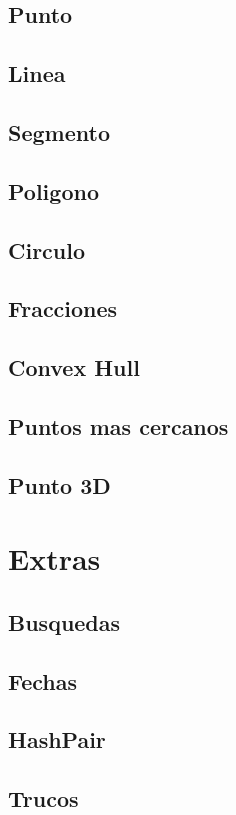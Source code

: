\subsection{Punto}
\raggedbottom
\hrulefill
\subsection{Linea}
\raggedbottom
\hrulefill
\subsection{Segmento}
\raggedbottom
\hrulefill
\subsection{Poligono}
\raggedbottom
\hrulefill
\subsection{Circulo}
\raggedbottom
\hrulefill
\subsection{Fracciones}
\raggedbottom
\hrulefill
\subsection{Convex Hull}
\raggedbottom
\hrulefill
\subsection{Puntos mas cercanos}
\raggedbottom
\hrulefill
\subsection{Punto 3D}
\raggedbottom
\hrulefill
\newpage

\section{Extras}
\subsection{Busquedas}
\raggedbottom
\hrulefill
\subsection{Fechas}
\raggedbottom
\hrulefill
\subsection{HashPair}
\raggedbottom
\hrulefill
\subsection{Trucos}
\raggedbottom
\hrulefill
\newpage


